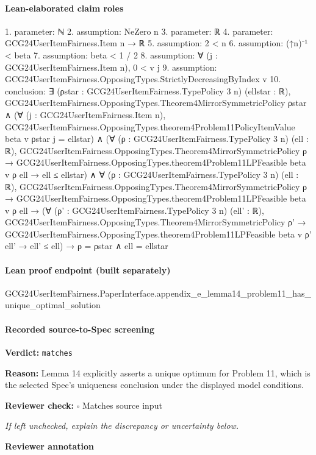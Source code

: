\documentclass[10pt]{article}
\newcommand{\reviewerbox}{%
  \par\noindent\fbox{\parbox{0.96\linewidth}{\rule{0pt}{0.38in}}}\par
}
\newcommand{\reviewmatch}[1]{%
  \par\noindent\textbf{Reviewer check:} $\square$\; #1\par
  \noindent\emph{If left unchecked, explain the discrepancy or uncertainty below.}\par
}
\begin{document}
\paragraph{Lean-elaborated claim roles}\begin{ReviewVerbatim}
1. parameter: ℕ
2. assumption: NeZero n
3. parameter: ℝ
4. parameter: GCG24UserItemFairness.Item n → ℝ
5. assumption: 2 < n
6. assumption: (↑n)⁻¹ < beta
7. assumption: beta < 1 / 2
8. assumption: ∀ (j : GCG24UserItemFairness.Item n), 0 < v j
9. assumption: GCG24UserItemFairness.OpposingTypes.StrictlyDecreasingByIndex v
10. conclusion: ∃ (ρstar : GCG24UserItemFairness.TypePolicy 3 n) (ellstar : ℝ),
  GCG24UserItemFairness.OpposingTypes.Theorem4MirrorSymmetricPolicy ρstar ∧
    (∀ (j : GCG24UserItemFairness.Item n),
        GCG24UserItemFairness.OpposingTypes.theorem4Problem11PolicyItemValue beta v ρstar j = ellstar) ∧
      (∀ (ρ : GCG24UserItemFairness.TypePolicy 3 n) (ell : ℝ),
          GCG24UserItemFairness.OpposingTypes.Theorem4MirrorSymmetricPolicy ρ →
            GCG24UserItemFairness.OpposingTypes.theorem4Problem11LPFeasible beta v ρ ell → ell ≤ ellstar) ∧
        ∀ (ρ : GCG24UserItemFairness.TypePolicy 3 n) (ell : ℝ),
          GCG24UserItemFairness.OpposingTypes.Theorem4MirrorSymmetricPolicy ρ →
            GCG24UserItemFairness.OpposingTypes.theorem4Problem11LPFeasible beta v ρ ell →
              (∀ (ρ' : GCG24UserItemFairness.TypePolicy 3 n) (ell' : ℝ),
                  GCG24UserItemFairness.OpposingTypes.Theorem4MirrorSymmetricPolicy ρ' →
                    GCG24UserItemFairness.OpposingTypes.theorem4Problem11LPFeasible beta v ρ' ell' → ell' ≤ ell) →
                ρ = ρstar ∧ ell = ellstar
\end{ReviewVerbatim}

\paragraph{Lean proof endpoint (built separately)}\begin{ReviewVerbatim}
GCG24UserItemFairness.PaperInterface.appendix_e_lemma14_problem11_has_unique_optimal_solution
\end{ReviewVerbatim}

\paragraph{Recorded source-to-Spec screening}
\textbf{Verdict:} \texttt{matches}
\\
{\raggedright
\textbf{Reason:} Lemma 14 explicitly asserts a unique optimum for Problem 11, which is the selected Spec's uniqueness conclusion under the displayed model conditions.\allowbreak{}
\par}
\reviewmatch{Matches source input}
\noindent\textbf{Reviewer annotation}\par
\reviewerbox
\clearpage
\hypertarget{source-claim-2442d32f650b179f}{}
\end{document}
